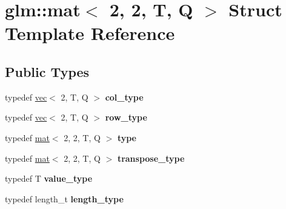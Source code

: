 \hypertarget{structglm_1_1mat_3_012_00_012_00_01T_00_01Q_01_4}{}\section{glm\+:\+:mat$<$ 2, 2, T, Q $>$ Struct Template Reference}
\label{structglm_1_1mat_3_012_00_012_00_01T_00_01Q_01_4}
\subsection*{Public Types}
\begin{DoxyCompactItemize}
\item 
\mbox{\label{structglm_1_1mat_3_012_00_012_00_01T_00_01Q_01_4_a2983591534ee443dd378cedcbe771749}} 
typedef \hyperlink{structglm_1_1vec}{vec}$<$ 2, T, Q $>$ {\bfseries col\+\_\+type}
\item 
\mbox{\label{structglm_1_1mat_3_012_00_012_00_01T_00_01Q_01_4_a362ebaadd84b755d779b8f35dbaa5ba9}} 
typedef \hyperlink{structglm_1_1vec}{vec}$<$ 2, T, Q $>$ {\bfseries row\+\_\+type}
\item 
\mbox{\label{structglm_1_1mat_3_012_00_012_00_01T_00_01Q_01_4_ac6dc94bb53f4e93c806d3b38cbf9172c}} 
typedef \hyperlink{structglm_1_1mat}{mat}$<$ 2, 2, T, Q $>$ {\bfseries type}
\item 
\mbox{\label{structglm_1_1mat_3_012_00_012_00_01T_00_01Q_01_4_a9635a76e3f23ca6da671e913dfd23bfd}} 
typedef \hyperlink{structglm_1_1mat}{mat}$<$ 2, 2, T, Q $>$ {\bfseries transpose\+\_\+type}
\item 
\mbox{\label{structglm_1_1mat_3_012_00_012_00_01T_00_01Q_01_4_a6bd6b4c0d4bf7dff724cc03096b92d40}} 
typedef T {\bfseries value\+\_\+type}
\item 
\mbox{\label{structglm_1_1mat_3_012_00_012_00_01T_00_01Q_01_4_a96c65b091fc8fe8e6f5637e30c9c1f81}} 
typedef length\+\_\+t {\bfseries length\+\_\+type}
\end{DoxyCompactItemize}
